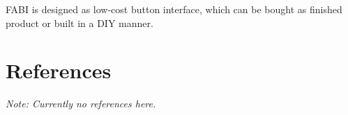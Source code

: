 \documentclass[]{scrreprt}%
\newcommand{\note}[1]{\textcolor{black!50}{\textit{Note: #1}}}
\begin{document}
FABI is designed as low-cost button interface, which can be bought as finished product or built in a DIY manner.


\section{References}

\note{Currently no references here.}


% 
% 
% 
%  



\end{document}
